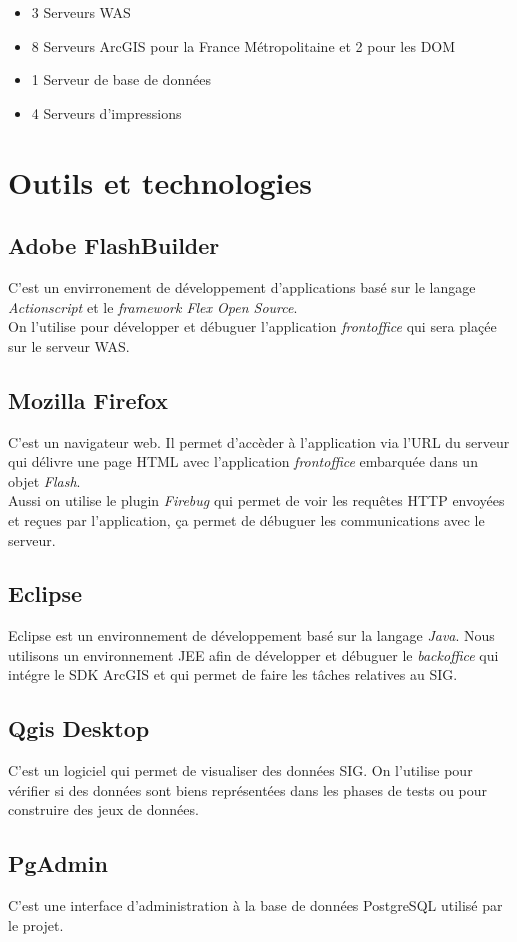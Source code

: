 \begin{itemize}
	\item 3 Serveurs WAS
	\item 8 Serveurs ArcGIS pour la France Métropolitaine et 2 pour les DOM
	\item 1 Serveur de base de données
	\item 4 Serveurs d'impressions\\
\end{itemize}
\section{Outils et technologies}
\subsection{Adobe FlashBuilder}
C'est un envirronement de développement d'applications basé sur le langage \textit{Actionscript} et le \textit{framework Flex Open Source}.
 \\On l'utilise pour développer et débuguer l'application \textit{frontoffice} qui sera plaçée sur le serveur WAS.
\subsection{Mozilla Firefox}
C'est un navigateur web.
 Il permet d'accèder à l'application via l'URL du serveur qui délivre une page HTML avec l'application \textit{frontoffice} embarquée dans un objet \textit{Flash}.
 \\Aussi on utilise le plugin \textit{Firebug} qui permet de voir les requêtes HTTP envoyées et reçues par l'application,
 ça permet de débuguer les communications avec le serveur.
\subsection{Eclipse} Eclipse est un environnement de développement basé sur la langage \textit{Java}. Nous utilisons un environnement JEE afin de développer et débuguer le \textit{backoffice} qui intégre le SDK ArcGIS et qui permet de faire
 les tâches relatives au SIG.
\subsection{Qgis Desktop} C'est un logiciel qui permet de visualiser des données SIG. On l'utilise pour vérifier si des données sont biens représentées dans les phases de tests ou pour construire des jeux de données.
\subsection{PgAdmin} C'est une interface d'administration à la base de données PostgreSQL utilisé par le projet.
